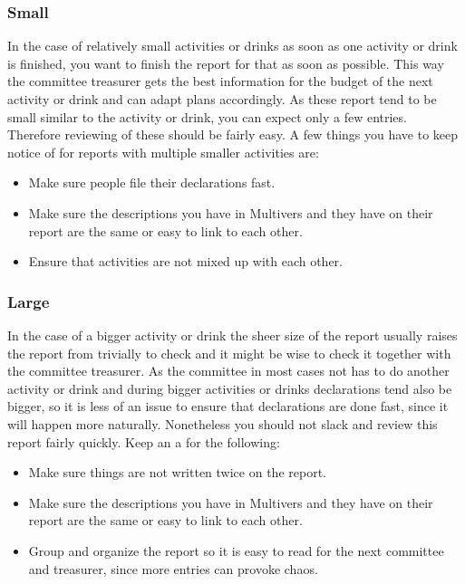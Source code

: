 \documentclass{report}
\begin{document}
\subsubsection{Small} 
In the case of relatively small activities or drinks as soon as one activity or drink is finished, you want to finish the report for that as soon as possible. This way the committee treasurer gets the best information for the budget of the next activity or drink and can adapt plans accordingly. As these report tend to be small similar to the activity or drink, you can expect only a few entries. Therefore reviewing of these should be fairly easy. A few things you have to keep notice of for reports with multiple smaller activities are: 
\begin{itemize} 
\vspace{-1mm}
\itemsep-1mm 
\item Make sure people file their declarations fast.
\item Make sure the descriptions you have in Multivers and they have on their report are the same or easy to link to each other. 
\item Ensure that activities are not mixed up with each other.
\end{itemize}

\subsubsection{Large}
In the case of a bigger activity or drink the sheer size of the report usually raises the report from trivially to check and it might be wise to check it together with the committee treasurer. As the committee in most cases not has to do another activity or drink and during bigger activities or drinks declarations tend also be bigger, so it is less of an issue to ensure that declarations are done fast, since it will happen more naturally. Nonetheless you should not slack and review this report fairly quickly. Keep an a for the following:
\begin{itemize} 
	\vspace{-1mm}
	\itemsep-1mm 
	\item Make sure things are not written twice on the report.
	\item Make sure the descriptions you have in Multivers and they have on their report are the same or easy to link to each other. 
	\item Group and organize the report so it is easy to read for the next committee and treasurer, since more entries can provoke chaos.
\end{itemize}
\end{document}

